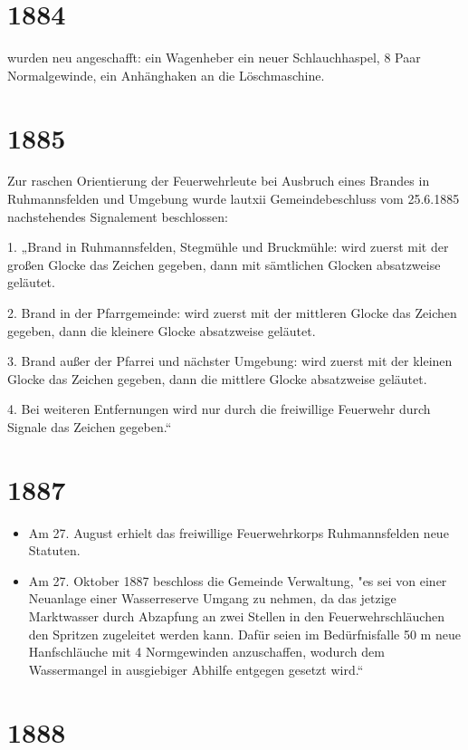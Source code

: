 \documentclass[12pt,a4paper]{book}
\begin{document}
\section*{1884}

wurden neu angeschafft: ein Wagenheber ein neuer Schlauchhaspel, 8 Paar
Normalgewinde, ein Anhänghaken an die Löschmaschine.

\section*{1885}

Zur raschen Orientierung der Feuerwehrleute bei Ausbruch eines Brandes in
Ruhmannsfelden und Umgebung wurde lautxii Gemeindebeschluss vom 25.6.1885
nachstehendes Signalement beschlossen:

1. „Brand in Ruhmannsfelden, Stegmühle und Bruckmühle: wird zuerst mit der
großen Glocke das Zeichen gegeben, dann mit sämtlichen Glocken absatzweise
geläutet.

2. Brand in der Pfarrgemeinde: wird zuerst mit der mittleren Glocke das Zeichen
gegeben, dann die kleinere Glocke absatzweise geläutet.

3. Brand außer der Pfarrei und nächster Umgebung: wird zuerst mit der kleinen
Glocke das Zeichen gegeben, dann die mittlere Glocke absatzweise geläutet.

4. Bei weiteren Entfernungen wird nur durch die freiwillige Feuerwehr durch
Signale das Zeichen gegeben.“

\section*{1887}

\begin{itemize}
\item Am 27. August erhielt das freiwillige Feuerwehrkorps Ruhmannsfelden neue
Statuten.

\item Am 27. Oktober 1887 beschloss die Gemeinde Verwaltung, "es sei von einer
Neuanlage einer Wasserreserve Umgang zu nehmen, da das jetzige Marktwasser durch
Abzapfung an zwei Stellen in den Feuerwehrschläuchen den Spritzen zugeleitet
werden kann. Dafür seien im Bedürfnisfalle 50 m neue Hanfschläuche mit 4
Normgewinden anzuschaffen, wodurch dem Wassermangel in ausgiebiger Abhilfe
entgegen gesetzt wird.“
\end{itemize}

\section*{1888}
\end{document}
